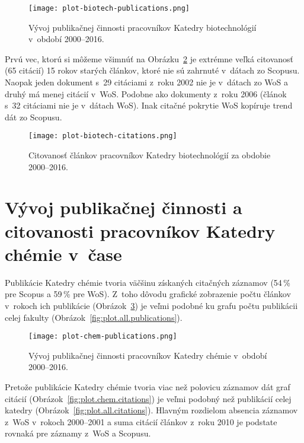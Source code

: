 \begin{figure}
  \centering
  \texttt{[image: plot-biotech-publications.png]}
  \caption{Vývoj publikačnej činnosti pracovníkov Katedry biotechnológií
    v~období 2000--2016.}
  \label{fig:plot.biotech.publications}
\end{figure}

Prvú vec, ktorú si môžeme všimnúť na Obrázku~\ref{fig:plot.biotech.citations} je
extrémne veľká citovanosť (65 citácií) 15 rokov starých článkov, ktoré nie sú
zahrnuté v~dátach zo Scopusu.  Naopak jeden dokument s~29 citáciami z~roku 2002
nie je v~dátach zo WoS a druhý má menej citácií v~WoS.  Podobne ako dokumenty
z~roku 2006 (článok s~32 citáciami nie je v~dátach WoS).  Inak citačné pokrytie
WoS kopíruje trend dát zo Scopusu.

\begin{figure}
  \centering
  \texttt{[image: plot-biotech-citations.png]}
  \caption{Citovanosť článkov pracovníkov Katedry biotechnológií za obdobie
    2000--2016.}
  \label{fig:plot.biotech.citations}
\end{figure}


\section{Vývoj publikačnej činnosti a citovanosti pracovníkov Katedry chémie
  v~čase}

Publikácie Katedry chémie tvoria väčšinu získaných citačných záznamov (54\,\%
pre Scopus a 59\,\% pre WoS).  Z~toho dôvodu grafické zobrazenie počtu článkov
v~rokoch ich publikácie (Obrázok~\ref{fig:plot.chem.publications}) je veľmi
podobné ku grafu počtu publikácii celej fakulty
(Obrázok~\ref{fig:plot.all.publications}).

\begin{figure}
  \centering
  \texttt{[image: plot-chem-publications.png]}
  \caption{Vývoj publikačnej činnosti pracovníkov Katedry chémie v~období
    2000--2016.}
  \label{fig:plot.chem.publications}
\end{figure}

Pretože publikácie Katedry chémie tvoria viac než polovicu záznamov dát graf
citácií (Obrázok~\ref{fig:plot.chem.citations}) je veľmi podobný než publikácií
celej katedry (Obrázok~\ref{fig:plot.all.citations}).  Hlavným rozdielom absencia
záznamov z~WoS v~rokoch 2000--2001 a suma citácií článkov z~roku 2010 je
podstate rovnaká pre záznamy z~WoS a Scopusu.

